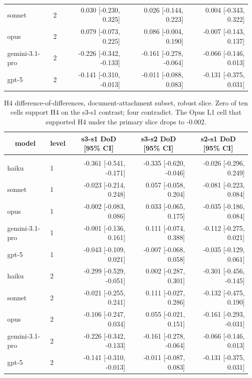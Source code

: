 \documentclass[10pt]{article} %
\begin{document}
\begin{table}[h]
\begin{center}
\begin{tabular}{llrrr}
            sonnet         & 2 &  0.030 [-0.230,  0.325] &  0.026 [-0.144,  0.223] &  0.004 [-0.343,  0.322] \\
            opus           & 2 &  0.079 [-0.073,  0.225] &  0.086 [-0.004,  0.190] & -0.007 [-0.143,  0.137] \\
            gemini-3.1-pro & 2 & -0.226 [-0.342, -0.133] & -0.161 [-0.278, -0.064] & -0.066 [-0.146,  0.013] \\
            gpt-5          & 2 & -0.141 [-0.310, -0.013] & -0.011 [-0.088,  0.083] & -0.131 [-0.375,  0.031] \\
        \end{tabular}
        \end{center}
    \end{table}

    \begin{table}[h]
        \caption{H4 difference-of-differences, document-attachment subset, robust slice. Zero of ten cells support H4 on the s3-s1 contrast; four contradict. The Opus L1 cell that supported H4 under the primary slice drops to -0.002.}
    \label{tab:h4_robust}
    \begin{center}
    \small
    \begin{tabular}{llrrr}
        \multicolumn{1}{c}{\bf model} & \multicolumn{1}{c}{\bf level} & \multicolumn{1}{c}{\bf s3-s1 DoD [95\% CI]} & \multicolumn{1}{c}{\bf s3-s2 DoD [95\% CI]} & \multicolumn{1}{c}{\bf s2-s1 DoD [95\% CI]} \\
        \hline \\
        haiku          & 1 & -0.361 [-0.541, -0.171] & -0.335 [-0.620, -0.046] & -0.026 [-0.296,  0.249] \\
        sonnet         & 1 & -0.023 [-0.214,  0.248] &  0.057 [-0.058,  0.204] & -0.081 [-0.223,  0.084] \\
        opus           & 1 & -0.002 [-0.083,  0.086] &  0.033 [-0.065,  0.175] & -0.035 [-0.186,  0.084] \\
        gemini-3.1-pro & 1 & -0.001 [-0.136,  0.161] &  0.111 [-0.074,  0.388] & -0.112 [-0.275,  0.021] \\
        gpt-5          & 1 & -0.043 [-0.109,  0.021] & -0.007 [-0.068,  0.058] & -0.035 [-0.129,  0.061] \\
        haiku          & 2 & -0.299 [-0.529, -0.051] &  0.002 [-0.287,  0.301] & -0.301 [-0.456, -0.145] \\
        sonnet         & 2 & -0.021 [-0.255,  0.241] &  0.111 [-0.027,  0.286] & -0.132 [-0.475,  0.190] \\
        opus           & 2 & -0.106 [-0.247,  0.034] &  0.055 [-0.021,  0.151] & -0.161 [-0.293, -0.031] \\
        gemini-3.1-pro & 2 & -0.226 [-0.342, -0.133] & -0.161 [-0.278, -0.064] & -0.066 [-0.146,  0.013] \\
        gpt-5          & 2 & -0.141 [-0.310, -0.013] & -0.011 [-0.087,  0.083] & -0.131 [-0.375,  0.031] \\
    \end{tabular}
    \end{center}
    \end{table}
\end{document}
